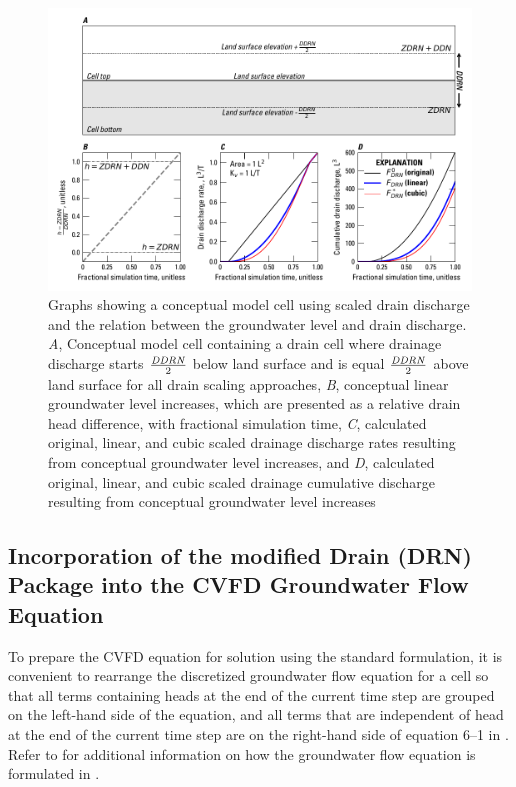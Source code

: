 \begin{figure}[!ht]
	\begin{center}
	\includegraphics{./Figures/DRNDischargeDifferences.pdf}
	\caption[Graphs showing a conceptual model cell using scaled drain discharge and the relation between the groundwater level and drain discharge]{Graphs showing a conceptual model cell using scaled drain discharge and the relation between the groundwater level and drain discharge. \textit{A}, Conceptual model cell containing a drain cell where drainage discharge starts $\frac{\mathit{DDRN}}{2}$ below land surface and is equal $\frac{\mathit{DDRN}}{2}$ above land surface for all drain scaling approaches, \textit{B}, conceptual linear groundwater level increases, which are presented as a relative drain head difference, with fractional simulation time, \textit{C}, calculated original, linear, and cubic scaled drainage discharge rates resulting from conceptual groundwater level increases, and \textit{D}, calculated original, linear, and cubic scaled drainage cumulative discharge resulting from conceptual groundwater level increases}
	\label{fig:drndischdiff}
	\end{center}
\end{figure}

\subsection{Incorporation of the modified Drain (DRN) Package into the CVFD Groundwater Flow Equation}

To prepare the CVFD equation for solution using the standard formulation, it is convenient to rearrange the discretized groundwater flow equation for a cell so that all terms containing heads at the end of the current time step are grouped on the left-hand side of the equation, and all terms that are independent of head at the end of the current time step are on the right-hand side of equation 6--1 in \cite{modflow6gwf}. Refer to \cite{modflow6gwf} for additional information on how the groundwater flow equation is formulated in \mf. 

